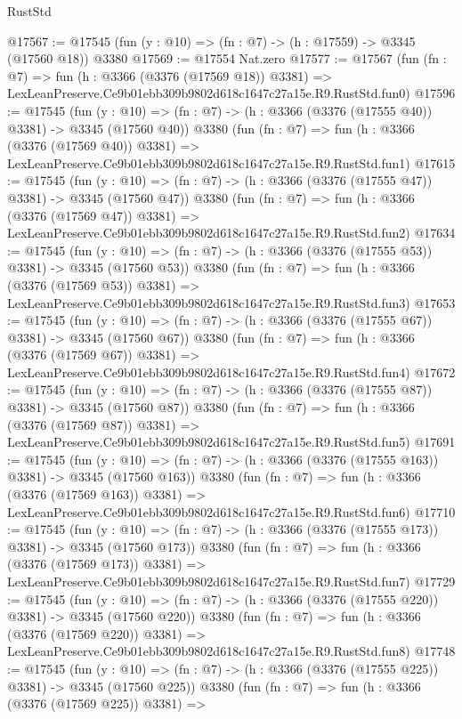 \begin{lexlean}{RustStd}
\begin{coremodule}
@17567 := @17545 (fun (y : @10) => (fn : @7) -> (h : @17559) -> @3345 (@17560 @18)) @3380
@17569 := @17554 Nat.zero
@17577 := @17567
    (fun (fn : @7) =>
    fun (h : @3366 (@3376 (@17569 @18)) @3381) =>
    LexLeanPreserve.Ce9b01ebb309b9802d618c1647c27a15e.R9.RustStd.fun0)
@17596 := @17545
    (fun (y : @10) => (fn : @7) -> (h : @3366 (@3376 (@17555 @40)) @3381) -> @3345 (@17560 @40))
    @3380
    (fun (fn : @7) =>
    fun (h : @3366 (@3376 (@17569 @40)) @3381) =>
    LexLeanPreserve.Ce9b01ebb309b9802d618c1647c27a15e.R9.RustStd.fun1)
@17615 := @17545
    (fun (y : @10) => (fn : @7) -> (h : @3366 (@3376 (@17555 @47)) @3381) -> @3345 (@17560 @47))
    @3380
    (fun (fn : @7) =>
    fun (h : @3366 (@3376 (@17569 @47)) @3381) =>
    LexLeanPreserve.Ce9b01ebb309b9802d618c1647c27a15e.R9.RustStd.fun2)
@17634 := @17545
    (fun (y : @10) => (fn : @7) -> (h : @3366 (@3376 (@17555 @53)) @3381) -> @3345 (@17560 @53))
    @3380
    (fun (fn : @7) =>
    fun (h : @3366 (@3376 (@17569 @53)) @3381) =>
    LexLeanPreserve.Ce9b01ebb309b9802d618c1647c27a15e.R9.RustStd.fun3)
@17653 := @17545
    (fun (y : @10) => (fn : @7) -> (h : @3366 (@3376 (@17555 @67)) @3381) -> @3345 (@17560 @67))
    @3380
    (fun (fn : @7) =>
    fun (h : @3366 (@3376 (@17569 @67)) @3381) =>
    LexLeanPreserve.Ce9b01ebb309b9802d618c1647c27a15e.R9.RustStd.fun4)
@17672 := @17545
    (fun (y : @10) => (fn : @7) -> (h : @3366 (@3376 (@17555 @87)) @3381) -> @3345 (@17560 @87))
    @3380
    (fun (fn : @7) =>
    fun (h : @3366 (@3376 (@17569 @87)) @3381) =>
    LexLeanPreserve.Ce9b01ebb309b9802d618c1647c27a15e.R9.RustStd.fun5)
@17691 := @17545
    (fun (y : @10) => (fn : @7) -> (h : @3366 (@3376 (@17555 @163)) @3381) -> @3345 (@17560 @163))
    @3380
    (fun (fn : @7) =>
    fun (h : @3366 (@3376 (@17569 @163)) @3381) =>
    LexLeanPreserve.Ce9b01ebb309b9802d618c1647c27a15e.R9.RustStd.fun6)
@17710 := @17545
    (fun (y : @10) => (fn : @7) -> (h : @3366 (@3376 (@17555 @173)) @3381) -> @3345 (@17560 @173))
    @3380
    (fun (fn : @7) =>
    fun (h : @3366 (@3376 (@17569 @173)) @3381) =>
    LexLeanPreserve.Ce9b01ebb309b9802d618c1647c27a15e.R9.RustStd.fun7)
@17729 := @17545
    (fun (y : @10) => (fn : @7) -> (h : @3366 (@3376 (@17555 @220)) @3381) -> @3345 (@17560 @220))
    @3380
    (fun (fn : @7) =>
    fun (h : @3366 (@3376 (@17569 @220)) @3381) =>
    LexLeanPreserve.Ce9b01ebb309b9802d618c1647c27a15e.R9.RustStd.fun8)
@17748 := @17545
    (fun (y : @10) => (fn : @7) -> (h : @3366 (@3376 (@17555 @225)) @3381) -> @3345 (@17560 @225))
    @3380
    (fun (fn : @7) =>
    fun (h : @3366 (@3376 (@17569 @225)) @3381) =>

\end{coremodule}
\end{lexlean}
